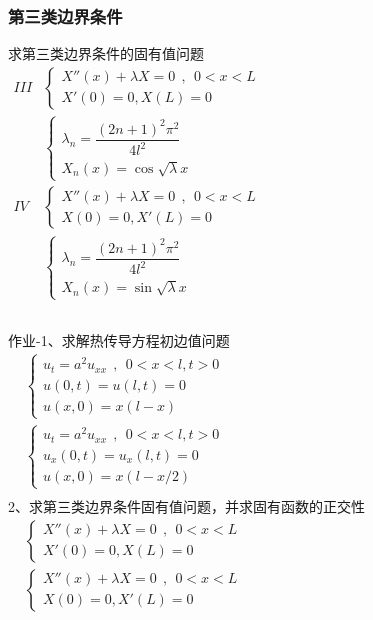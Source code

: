 \begin{frame}
	\frametitle{第三类边界条件}
	求第三类边界条件的固有值问题\\
	$\begin{array}{lllllllll}
	III & \begin{cases}
			X'' (x)  + \lambda X =0   ~~,~~ 0<x<L\\
			X' (0) =0, X (L) =0
	\end{cases}\\	
	& \begin{cases}
		\lambda_n=\dfrac{(2n+1)^2 \pi ^2}{4l^2}\\
		X_n(x) = \cos \sqrt{\lambda} x
	\end{cases}\\	
	IV&\begin{cases}
		X'' (x)  + \lambda X =0   ~~,~~ 0<x<L\\
		X (0) =0, X' (L) =0
	\end{cases} \\	
	& \begin{cases}
		\lambda_n=\dfrac{(2n+1)^2 \pi ^2}{4l^2}\\
		X_n(x) = \sin \sqrt{\lambda} x
    \end{cases}\\	
	\end{array}$ \\ 
\end{frame}	

\begin{frame}
	\frametitle{}
	作业-1、求解热传导方程初边值问题\\
	$\begin{array}{lllllllll}
		&\begin{cases}
			u_{t} =a^2u_{xx} ~~,~~ 0<x<l, t>0\\
			u(0,t) =u(l,t)=0 \\
			u(x,0) =x (l-x)
		\end{cases}\\	
		&\begin{cases}
			u_{t} =a^2u_{xx} ~~,~~ 0<x<l, t>0\\
			u_x(0,t) =u_x(l,t)=0 \\
			u(x,0) =x(l-x/2)
		\end{cases} \\	
	\end{array}$ \\ 
	2、求第三类边界条件固有值问题，并求固有函数的正交性\\
	$\begin{array}{lllllllll}
		& \begin{cases}
			X'' (x)  + \lambda X =0   ~~,~~ 0<x<L\\
			X' (0) =0, X (L) =0
		\end{cases}\\	
		&\begin{cases}
			X'' (x)  + \lambda X =0   ~~,~~ 0<x<L\\
			X (0) =0, X' (L) =0
		\end{cases} \\	
	\end{array}$ 	
\end{frame}	


